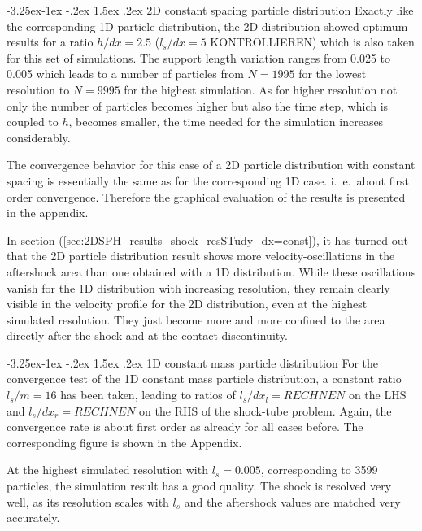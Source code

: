 \documentclass{report}
\makeatletter
\renewcommand\paragraph{\@startsection{paragraph}{4}{\z@}%
  {-3.25ex\@plus -1ex \@minus -.2ex}%
  {1.5ex \@plus .2ex}%
  {\normalfont\normalsize\bfseries}}
\makeatother
\begin{document}
\paragraph{2D constant spacing particle distribution}
Exactly like the corresponding 1D particle distribution, the 2D distribution showed optimum results for a ratio $h/dx=2.5$ ($l_s/dx=5$ KONTROLLIEREN) which is also taken for this set of simulations. The support length variation ranges from 0.025 to 0.005 which leads to a number of particles from $N=1995$ for the lowest resolution to $N=9995$ for the highest simulation. As for higher resolution not only the number of particles becomes higher but also the time step, which is coupled to $h$, becomes smaller, the time needed for the simulation increases considerably. %

The convergence behavior for this case of a 2D particle distribution with constant spacing is essentially the same as for the corresponding 1D case. i.\ e.\ about first order convergence. Therefore the graphical evaluation of the results is presented in the appendix.

In section (\ref{sec:2DSPH_results_shock_resSTudy_dx=const}), it has turned out that the 2D particle distribution result shows more velocity-oscillations in the aftershock area than one obtained with a 1D distribution. While these oscillations vanish for the 1D distribution with increasing resolution, they remain clearly visible in the velocity profile for the 2D distribution, even at the highest simulated resolution. They just become more and more confined to the area directly after the shock and at the contact discontinuity. 

 
\paragraph{1D constant mass particle distribution}
For the convergence test of the 1D constant mass particle distribution, a constant ratio $l_s/m=16$ has been taken, leading to ratios of $l_s/dx_l=RECHNEN$ on the LHS and $l_s/dx_r=RECHNEN$ on the RHS of the shock-tube problem. Again, the convergence rate is about first order as already for all cases before. The corresponding figure is shown in the Appendix. 

At the highest simulated resolution with $l_s=0.005$, corresponding to 3599 particles, the simulation result has a good quality. The shock is resolved very well, as its resolution scales with $l_s$ and the aftershock values are matched very accurately.
\end{document}
